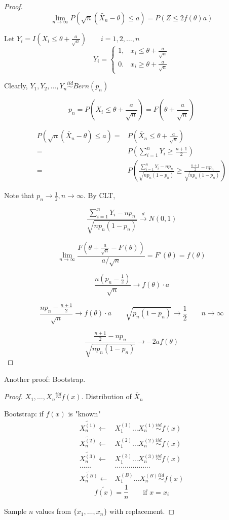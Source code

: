 \begin{proof}
\[\lim_{n \to\infty} P(\sqrt{n}(\tilde{X_n}-\theta)\leq a)=P(Z \leq 2 f(\theta)a)\]

Let $Y_i=I\left(X_i\leq \theta+\frac{a}{\sqrt{n}}\right) \qquad i=1,2,\dots,n$
\[Y_i=\begin{cases}
1, & x_i\leq \theta+\frac{a}{\sqrt{n}} \\
0. & x_i\geq \theta+\frac{a}{\sqrt{n}} 
\end{cases}\]

Clearly, $Y_1,Y_2,\dots,Y_n \overset{iid}{\sim} Bern(p_n)$

\[p_n=P\left(X_i\leq \theta+\frac{a}{\sqrt{n}}\right)=F\left( \theta+\frac{a}{\sqrt{n}}\right)\]

\begin{align*}
P(\sqrt{n}(\tilde{X_n}-\theta)\leq a)= & P\left(\tilde{X_n}\leq \theta+\frac{a}{\sqrt{n}}\right)\\
= & P\left( \sum_{i=1}^{n} Y_i \geq \frac{n+1}{2} \right) \\
= & P\left(\frac{\sum_{i=1}^{n} Y_i -n p_n}{\sqrt{n p_n(1-p_n)}} \geq \frac{\frac{n+1}{2} -n p_n}{\sqrt{n p_n(1-p_n)}}\right)
\end{align*}

Note that $p_n \to\frac{1}{2}, n\to \infty$. By CLT,

\[ \frac{\sum_{i=1}^{n} Y_i -n p_n}{\sqrt{n p_n(1-p_n)}}  \overset{d}{\to} N(0,1)\]

\[\lim_{n\to\infty} \frac{F\left(\theta+\frac{a}{\sqrt{n}}-F(\theta)\right)}{a/\sqrt{n}}=F'(\theta)=f(\theta)\]

\[\frac{n\left(p_n-\frac{1}{2}\right)}{\sqrt{n}} \longrightarrow f(\theta)\cdot a\]

\[\frac{np_n-\frac{n+1}{2}}{\sqrt{n}} \longrightarrow f(\theta)\cdot a \qquad \sqrt{p_n(1-p_n)} \longrightarrow \frac{1}{2} \qquad n\to\infty\]

\[\frac{\frac{n+1}{2} -n p_n}{\sqrt{n p_n(1-p_n)}}\longrightarrow -2af(\theta)\]
\end{proof}

Another proof: Bootstrap.
\begin{proof}
$X_1,\dots,X_n \overset{iid}{\sim} f(x)$. Distribution of $\tilde{X_n}$

Bootstrap: if $f(x)$ is "known"
\begin{align*}
\tilde{X_n^{(1)}} \leftarrow & X_1^{(1)} \dots X_n^{(1)} \overset{iid}{\sim} f(x)  \\
\tilde{X_n^{(2)}} \leftarrow & X_1^{(2)} \dots X_n^{(2)} \overset{iid}{\sim} f(x)  \\
\tilde{X_n^{(3)}} \leftarrow & X_1^{(3)} \dots X_n^{(3)} \overset{iid}{\sim} f(x)  \\
\dots\dots & \dots\dots\dots\dots\dots\dots \\
\tilde{X_n^{(B)}} \leftarrow & X_1^{(B)} \dots X_n^{(B)} \overset{iid}{\sim} f(x)  
\end{align*}
\[\tilde{f(x)}=\frac{1}{n} \qquad \text{if } x=x_i\]

Sample $n$ values from $\{x_1,\dots,x_n\}$ with replacement.
\end{proof}